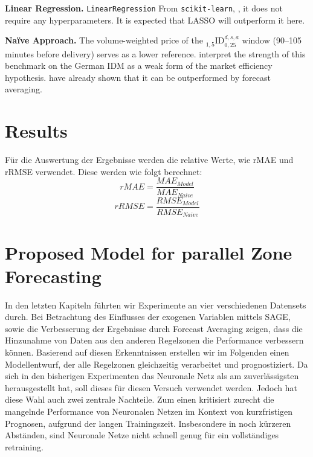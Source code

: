 \documentclass[preprint,12pt,nonatbib]{elsarticle}
\begin{document}
\textbf{Linear Regression.}
\texttt{LinearRegression} From \texttt{scikit-learn}, \cite{Pedregosa.2011}, it does not require any hyperparameters.
It is expected that LASSO will outperform it here.

\textbf{Naïve Approach.}
The volume-weighted price of the ${}_{1{,}5}^{\;}\!\text{ID}_{0{,}25}^{d,s,a}$ window (90–105 minutes before delivery) serves as a lower reference.
\cite{Narajewski.2020} interpret the strength of this benchmark on the German IDM as a weak form of the market efficiency hypothesis. \cite{Marcjasz.2020} have already shown that it can be outperformed by forecast averaging.

\section{Results}
Für die Auswertung der Ergebnisse werden die relative Werte, wie rMAE und rRMSE verwendet.
Diese werden wie folgt berechnet:
\begin{equation}
    rMAE = \frac{MAE_{Model}}{MAE_{Naive}}
\end{equation}
\begin{equation}
    rRMSE = \frac{RMSE_{Model}}{RMSE_{Naive}}
\end{equation}



\section{Proposed Model for parallel Zone Forecasting}
In den letzten Kapiteln führten wir Experimente an vier verschiedenen Datensets durch.
Bei Betrachtung des Einflusses der exogenen Variablen mittels SAGE, sowie die Verbesserung der Ergebnisse durch Forecast Averaging zeigen, dass die Hinzunahme von Daten aus den anderen Regelzonen die Performance verbessern können.
Basierend auf diesen Erkenntnissen erstellen wir im Folgenden einen Modellentwurf, der alle Regelzonen gleichzeitig verarbeitet und prognostiziert.
Da sich in den bisherigen Experimenten das Neuronale Netz als am zuverlässigsten herausgestellt hat, soll dieses für diesen Versuch verwendet werden.
Jedoch hat diese Wahl auch zwei zentrale Nachteile. 
Zum einen kritisiert \cite{puć2024} zurecht die mangelnde Performance von Neuronalen Netzen im Kontext von kurzfristigen Prognosen, aufgrund der langen Trainingszeit.
Insbesondere in noch kürzeren Abständen, sind Neuronale Netze nicht schnell genug für ein vollständiges retraining.

\newpage

\printbibliography
\end{document}
